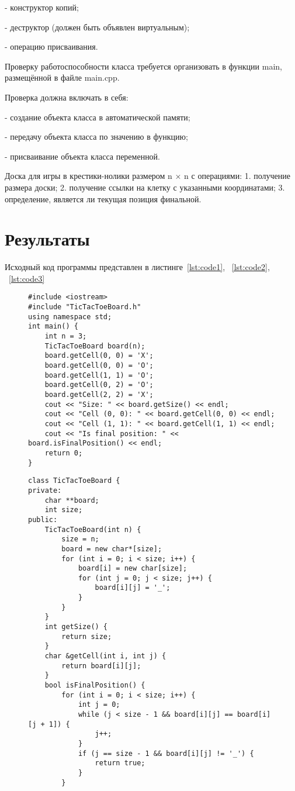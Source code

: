 \documentclass[a4paper, 14pt]{extarticle}
\begin{document}
- конструктор копий;

- деструктор (должен быть объявлен виртуальным);

- операцию присваивания.

Проверку работоспособности класса требуется организовать в функции main, размещённой в файле main.cpp.

Проверка должна включать в себя:

- создание объекта класса в автоматической памяти;

- передачу объекта класса по значению в функцию;

- присваивание объекта класса переменной.


    Доска для игры в крестики-нолики размером n ×
n с операциями:
1. получение размера доски;
2. получение ссылки на клетку с указанными
координатами;
3. определение, является ли текущая позиция
финальной.
\section{Результаты}\label{Sect::res}

Исходный код программы представлен в листинге~\ref{lst:code1}, ~\ref{lst:code2}, ~\ref{lst:code3}

\begin{figure}[!htb]
\begin{lstlisting}[language={},caption={main.cpp},label={lst:code1}]
#include <iostream>
#include "TicTacToeBoard.h"
using namespace std;
int main() {
    int n = 3;
    TicTacToeBoard board(n);
    board.getCell(0, 0) = 'X';
    board.getCell(0, 0) = 'O';
    board.getCell(1, 1) = 'O';
    board.getCell(0, 2) = 'O';
    board.getCell(2, 2) = 'X';
    cout << "Size: " << board.getSize() << endl;
    cout << "Cell (0, 0): " << board.getCell(0, 0) << endl;
    cout << "Cell (1, 1): " << board.getCell(1, 1) << endl;
    cout << "Is final position: " << board.isFinalPosition() << endl;
    return 0;
}
\end{lstlisting}
\end{figure}

\begin{figure}[!htb]
\begin{lstlisting}[language={},caption={класс TicTacToeBoard},label={lst:code2}]
class TicTacToeBoard {
private:
    char **board;
    int size;
public:
    TicTacToeBoard(int n) {
        size = n;
        board = new char*[size];
        for (int i = 0; i < size; i++) {
            board[i] = new char[size];
            for (int j = 0; j < size; j++) {
                board[i][j] = '_';
            }
        }
    }
    int getSize() {
        return size;
    }
    char &getCell(int i, int j) {
        return board[i][j];
    }
    bool isFinalPosition() {
        for (int i = 0; i < size; i++) {
            int j = 0;
            while (j < size - 1 && board[i][j] == board[i][j + 1]) {
                j++;
            }
            if (j == size - 1 && board[i][j] != '_') {
                return true;
            }
        }
\end{lstlisting}
\end{figure}
\end{document}

